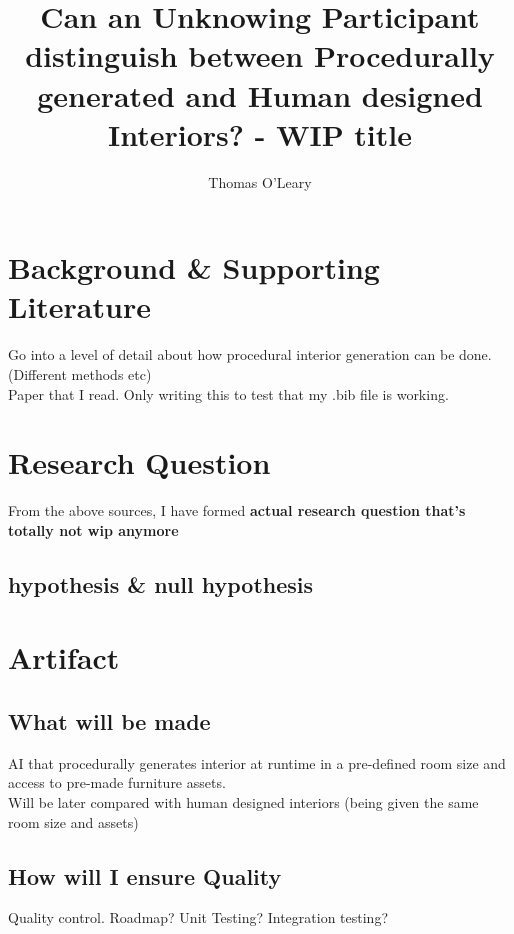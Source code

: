 \documentclass[journal]{IEEEtran}
\begin{document}
\title{Can an Unknowing Participant distinguish between Procedurally generated and Human designed Interiors? - WIP title}

\author{Thomas O'Leary}

\maketitle




    
\section{Background \& Supporting Literature}
    Go into a level of detail about how procedural interior generation can be done. (Different methods etc)
    \\
    Paper that I read. Only writing this to test that my .bib file is working. \cite{real-time}

\section{Research Question}
    From the above sources, I have formed \textbf{actual research question that's totally not wip anymore}
    \subsection{hypothesis \& null hypothesis}

\section{Artifact}
    \subsection{What will be made}
        AI that procedurally generates interior at runtime in a pre-defined room size and access to pre-made furniture assets. \\
        Will be later compared with human designed interiors (being given the same room size and assets)


    \subsection{How will I ensure Quality}
        Quality control. Roadmap? Unit Testing? Integration testing?
\end{document}

